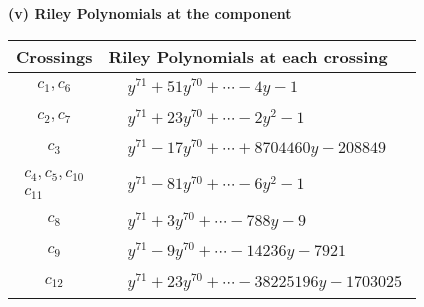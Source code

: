 \documentclass[1p]{elsarticle_modified}
\theoremstyle{definition}
\begin{document}
\newpage\renewcommand{\arraystretch}{1}
\flushleft \textbf{(v) Riley Polynomials at the component}\newline \\
\begin{tabular}{m{50pt}|m{274pt}}
Crossings & \hspace{64pt}Riley Polynomials at each crossing \\
\hline $$\begin{aligned}c_{1},c_{6}\end{aligned}$$&$\begin{aligned}
&y^{71}+51 y^{70}+\cdots-4 y-1
\end{aligned}$\\
\hline $$\begin{aligned}c_{2},c_{7}\end{aligned}$$&$\begin{aligned}
&y^{71}+23 y^{70}+\cdots-2 y^2-1
\end{aligned}$\\
\hline $$\begin{aligned}c_{3}\end{aligned}$$&$\begin{aligned}
&y^{71}-17 y^{70}+\cdots+8704460 y-208849
\end{aligned}$\\
\hline $$\begin{aligned}c_{4},c_{5},c_{10}\\c_{11}\end{aligned}$$&$\begin{aligned}
&y^{71}-81 y^{70}+\cdots-6 y^2-1
\end{aligned}$\\
\hline $$\begin{aligned}c_{8}\end{aligned}$$&$\begin{aligned}
&y^{71}+3 y^{70}+\cdots-788 y-9
\end{aligned}$\\
\hline $$\begin{aligned}c_{9}\end{aligned}$$&$\begin{aligned}
&y^{71}-9 y^{70}+\cdots-14236 y-7921
\end{aligned}$\\
\hline $$\begin{aligned}c_{12}\end{aligned}$$&$\begin{aligned}
&y^{71}+23 y^{70}+\cdots-38225196 y-1703025
\end{aligned}$\\
\hline
\end{tabular}\\~\\
\end{document}
